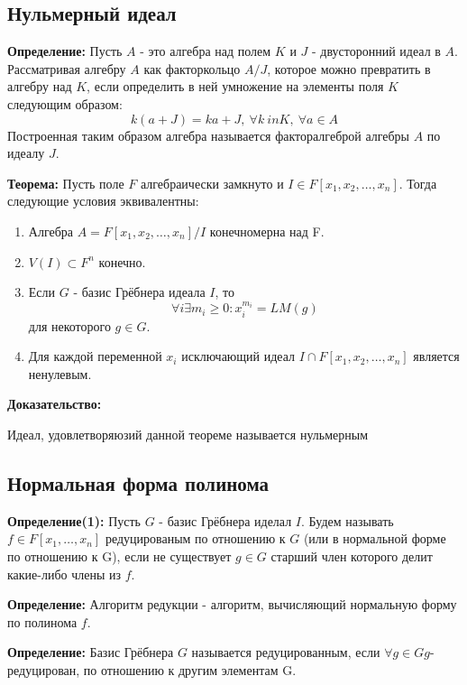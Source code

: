 \documentclass{article}
\begin{document}
    \newpage
    \subsection{Нульмерный идеал}
    \textbf{Определение:} Пусть $A$  - это алгебра над полем $K$ и $J$ - двусторонний идеал в $A$. Рассматривая
    алгебру $A$ как факторкольцо $A/J$, которое можно превратить в алгебру над $K$, если определить в ней умножение
    на элементы поля $K$ следующим образом:
    $$k(a+J) = ka+J, \: \forall k\ in K,\: \forall a \in A$$
    Построенная таким образом алгебра называется факторалгеброй алгебры $A$ по идеалу $J$.

    \textbf{Теорема:} Пусть поле $F$ алгебраически замкнуто и $I\in F[x_1, x_2,\ldots, x_n]$.
       Тогда следующие условия эквивалентны:
        
        \begin{enumerate}
            \item Алгебра $A=F[x_1, x_2,\ldots, x_n]/I$ конечномерна над F.
            \item $V(I) \subset F^n$ конечно.
            \item Если $G$ - базис Грёбнера идеала $I$, то $$\forall i \exists m_i \geq 0 : x_i^{m_i} = LM(g)$$ для некоторого $g \in G$.
            \item Для каждой переменной $x_i$ исключающий идеал $I \cap F[x_1, x_2,\ldots, x_n]$ является ненулевым.
        \end{enumerate}

        \textbf{Доказательство:}

      Идеал, удовлетворяюзий данной теореме называется нульмерным

    \newpage

    \subsection{Нормальная форма полинома}

    
    \textbf{Определение(1):} Пусть $G$ - базис Грёбнера иделал $I$.
    Будем называть $f \in F[x_1,\ldots,x_n]$ редуцированым по отношению к $G$ (или в нормальной форме по отношению к G), если 
    не существует $g \in G$ старший член которого делит какие-либо члены из $f$.
    
    \textbf{Определение:} Алгоритм редукции - алгоритм, вычисляющий нормальную форму по полинома $f$.
    
    \textbf{Определение:} Базис Грёбнера $G$ называется редуцированным, если $\forall g \in G g$- редуцирован, по отношению к другим элементам G.
    
\end{document}
